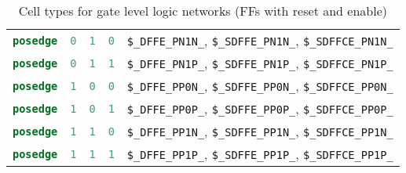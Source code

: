\begin{table}[t]
\begin{tabular}[t]{lllll}
\lstinline[language=Verilog];posedge; & \lstinline[language=Verilog];0; & \lstinline[language=Verilog];1; & \lstinline[language=Verilog];0; & {\tt \$\_DFFE\_PN1N\_}, {\tt \$\_SDFFE\_PN1N\_}, {\tt \$\_SDFFCE\_PN1N\_} \\
\lstinline[language=Verilog];posedge; & \lstinline[language=Verilog];0; & \lstinline[language=Verilog];1; & \lstinline[language=Verilog];1; & {\tt \$\_DFFE\_PN1P\_}, {\tt \$\_SDFFE\_PN1P\_}, {\tt \$\_SDFFCE\_PN1P\_} \\
\lstinline[language=Verilog];posedge; & \lstinline[language=Verilog];1; & \lstinline[language=Verilog];0; & \lstinline[language=Verilog];0; & {\tt \$\_DFFE\_PP0N\_}, {\tt \$\_SDFFE\_PP0N\_}, {\tt \$\_SDFFCE\_PP0N\_} \\
\lstinline[language=Verilog];posedge; & \lstinline[language=Verilog];1; & \lstinline[language=Verilog];0; & \lstinline[language=Verilog];1; & {\tt \$\_DFFE\_PP0P\_}, {\tt \$\_SDFFE\_PP0P\_}, {\tt \$\_SDFFCE\_PP0P\_} \\
\lstinline[language=Verilog];posedge; & \lstinline[language=Verilog];1; & \lstinline[language=Verilog];1; & \lstinline[language=Verilog];0; & {\tt \$\_DFFE\_PP1N\_}, {\tt \$\_SDFFE\_PP1N\_}, {\tt \$\_SDFFCE\_PP1N\_} \\
\lstinline[language=Verilog];posedge; & \lstinline[language=Verilog];1; & \lstinline[language=Verilog];1; & \lstinline[language=Verilog];1; & {\tt \$\_DFFE\_PP1P\_}, {\tt \$\_SDFFE\_PP1P\_}, {\tt \$\_SDFFCE\_PP1P\_} \\
\end{tabular}
\caption{Cell types for gate level logic networks (FFs with reset and enable)}
\label{tab:CellLib_gates_adffe}
\end{table}

